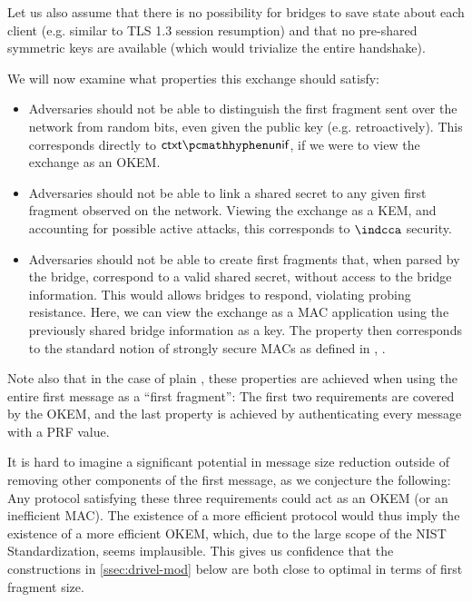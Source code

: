 Let us also assume that there is no possibility for bridges to save state about each client (e.g. similar to TLS 1.3 session resumption) and that no pre-shared symmetric keys are available (which would trivialize the entire handshake).

We will now examine what properties this exchange should satisfy:
\begin{itemize}
    \item Adversaries should not be able to distinguish the first fragment sent over the network from random bits, even given the public key (e.g. retroactively). This corresponds directly to $\ctxtunif$, if we were to view the exchange as an OKEM.

    \item Adversaries should not be able to link a shared secret to any given first fragment observed on the network. Viewing the exchange as a KEM, and accounting for possible active attacks, this corresponds to $\indcca$ security.
    
    \item Adversaries should not be able to create first fragments that, when parsed by the bridge, correspond to a valid shared secret, without access to the bridge information. This would allows bridges to respond, violating probing resistance. Here, we can view the exchange as a MAC application using the previously shared bridge information as a key. The property then corresponds to the standard notion of strongly secure MACs as defined in \cite[Definition~4.3]{katz_lindell}, \cite[Chapter~2]{AC:BelNam00}.
\end{itemize}

Note also that in the case of plain \drivel{}, these properties are achieved when using the entire first message as a ``first fragment'': The first two requirements are covered by the OKEM, and the last property is achieved by authenticating every message with a PRF value.

It is hard to imagine a significant potential in message size reduction outside of removing other components of the first \drivel{} message, as we conjecture the following: Any protocol satisfying these three requirements could act as an OKEM (or an inefficient MAC). The existence of a more efficient protocol would thus imply the existence of a more efficient OKEM, which, due to the large scope of the NIST Standardization, seems implausible. This gives us confidence that the constructions in \cref{ssec:drivel-mod} below are both close to optimal in terms of first fragment size.

